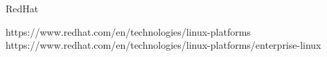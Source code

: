 \label{sec:redhat}
RedHat


https://www.redhat.com/en/technologies/linux-platforms
https://www.redhat.com/en/technologies/linux-platforms/enterprise-linux